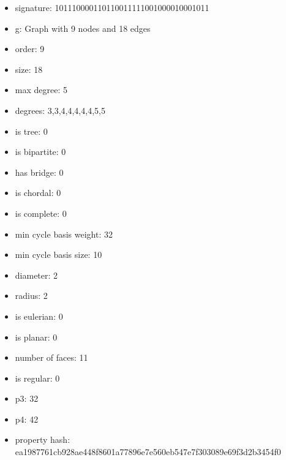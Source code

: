 \newpage
\begin{figure}
\end{figure}
\begin{itemize}
\item signature: 101110000110110011111001000010001011
\item g: Graph with 9 nodes and 18 edges
\item order: 9
\item size: 18
\item max degree: 5
\item degrees: 3,3,4,4,4,4,4,5,5
\item is tree: 0
\item is bipartite: 0
\item has bridge: 0
\item is chordal: 0
\item is complete: 0
\item min cycle basis weight: 32
\item min cycle basis size: 10
\item diameter: 2
\item radius: 2
\item is eulerian: 0
\item is planar: 0
\item number of faces: 11
\item is regular: 0
\item p3: 32
\item p4: 42
\item property hash: ea1987761cb928ae448f8601a77896e7e560eb547e7f303089e69f3d2b3454f0
\end{itemize}
